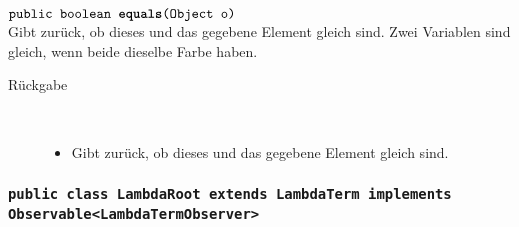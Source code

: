 \begin{description}
	\item $\texttt{public boolean \textbf{equals}(Object o)}$ \\ Gibt zurück, ob dieses und das gegebene Element gleich sind. Zwei Variablen sind gleich, wenn beide dieselbe Farbe haben.
	\begin{description}
		\item[Rückgabe] \hfill \\
		\vspace{-.8cm}
		\begin{itemize}
			\item Gibt zurück, ob dieses und das gegebene Element gleich sind.
		\end{itemize}
	\end{description}
\end{description}

\subsubsection{\normalfont \texttt{public class \textbf{LambdaRoot} extends LambdaTerm implements Observable<LambdaTermObserver>}}

